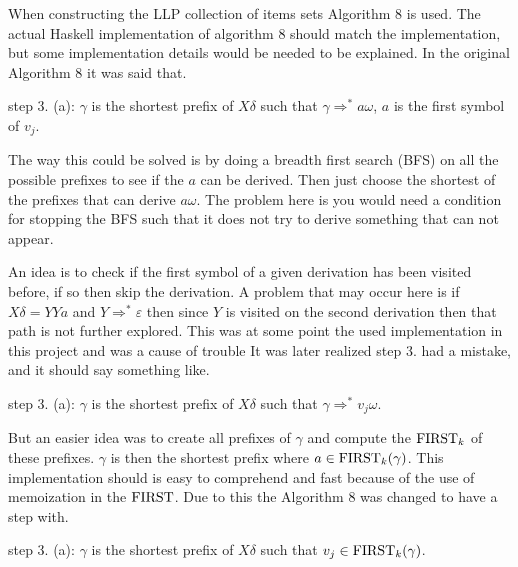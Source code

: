 When constructing the LLP collection of items sets Algorithm 8 \cite[13]{Vagner2007} is used. The actual Haskell implementation of algorithm 8 should match the implementation, but some implementation details would be needed to be explained. In the original Algorithm 8 it was said that. 
\begin{center}
    step 3. (a): $\gamma$ is the shortest prefix of $X\delta$ such that $\gamma \Rightarrow^* a\omega$, $a$ is the first symbol of $v_j$. 
\end{center}
The way this could be solved is by doing a breadth first search (BFS) on all the possible prefixes to see if the $a$ can be derived. Then just choose the shortest of the prefixes that can derive $a\omega$.  The problem here is you would need a condition for stopping the BFS such that it does not try to derive something that can not appear.

An idea is to check if the first symbol of a given derivation has been visited before, if so then skip the derivation. A problem that may occur here is if $X\delta = YYa$ and $Y \Rightarrow^* \varepsilon$ then since $Y$ is visited on the second derivation then that path is not further explored. This was at some point the used implementation in this project and was a cause of trouble It was later realized step 3. had a mistake, and it should say something like.
\begin{center}
    step 3. (a): $\gamma$ is the shortest prefix of $X\delta$ such that $\gamma \Rightarrow^* v_j\omega$. 
\end{center}
But an easier idea was to create all prefixes of $\gamma$ and compute the $\text{FIRST}_k$ of these prefixes. $\gamma$ is then the shortest prefix where $a \in \text{FIRST}_k(\gamma)$. This implementation should is easy to comprehend and fast because of the use of memoization in the $\text{FIRST}$. Due to this the Algorithm 8 was changed to have a step with.
\begin{center}
    step 3. (a): $\gamma$ is the shortest prefix of $X\delta$ such that $v_j \in \text{FIRST}_k(\gamma)$. 
\end{center}